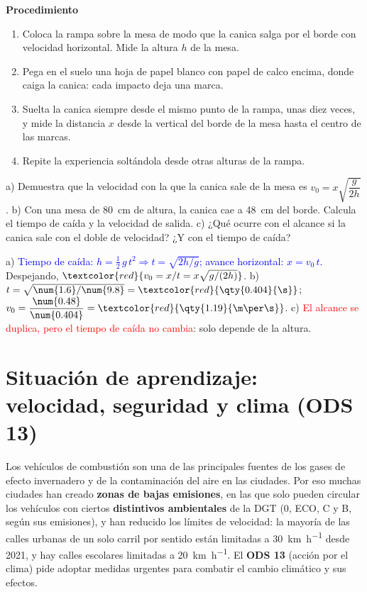 \textbf{Procedimiento}
\begin{enumerate}[label=\numberballgreen]
    \item Coloca la rampa sobre la mesa de modo que la canica salga por el borde con velocidad horizontal. Mide la altura \(h\) de la
    mesa.
    \item Pega en el suelo una hoja de papel blanco con papel de calco encima, donde caiga la canica: cada impacto deja una marca.
    \item Suelta la canica siempre desde el mismo punto de la rampa, unas diez veces, y mide la distancia \(x\) desde la vertical del
    borde de la mesa hasta el centro de las marcas.
    \item Repite la experiencia soltándola desde otras alturas de la rampa.
\end{enumerate}

\begin{exercise}
    a) Demuestra que la velocidad con la que la canica sale de la mesa es \(v_0 = x\sqrt{\dfrac{g}{2h}}\). b) Con una mesa de
    \qty{80}{\cm} de altura, la canica cae a \qty{48}{\cm} del borde. Calcula el tiempo de caída y la velocidad de salida. c) ¿Qué
    ocurre con el alcance si la canica sale con el doble de velocidad? ¿Y con el tiempo de caída?
    \begin{solu}
        a) \textcolor{blue}{Tiempo de caída: \(h = \frac{1}{2}\,g\,t^2 \Rightarrow t = \sqrt{2h/g}\); avance horizontal: \(x = v_0\,t\).}
        Despejando, \(\textcolor{red}{v_0 = x/t = x\sqrt{g/(2h)}}\). b) \(t = \sqrt{\num{1.6}/\num{9.8}} = \textcolor{red}{\qty{0.404}{\s}}\);
        \(v_0 = \dfrac{\num{0.48}}{\num{0.404}} = \textcolor{red}{\qty{1.19}{\m\per\s}}\). c) \textcolor{red}{El alcance se duplica,
        pero el tiempo de caída no cambia}: solo depende de la altura.
    \end{solu}
\end{exercise}

\section{Situación de aprendizaje: velocidad, seguridad y clima (ODS 13)}\label{sec:ud9-ods}

Los vehículos de combustión son una de las principales fuentes de los gases de efecto invernadero y de la contaminación del aire en
las ciudades. Por eso muchas ciudades han creado \textbf{zonas de bajas emisiones}, en las que solo pueden circular los vehículos con
ciertos \textbf{distintivos ambientales} de la DGT (0, ECO, C y B, según sus emisiones), y han reducido los límites de velocidad: la
mayoría de las calles urbanas de un solo carril por sentido están limitadas a \qty{30}{\km\per\hour} desde 2021, y hay calles
escolares limitadas a \qty{20}{\km\per\hour}. El \textbf{ODS 13} (acción por el clima) pide adoptar medidas urgentes para combatir el
cambio climático y sus efectos.

